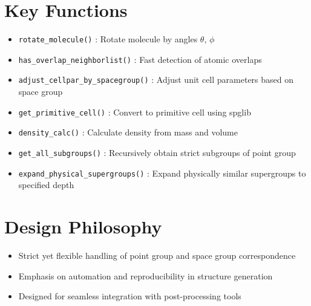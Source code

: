 \documentclass[12pt]{article}
\begin{document}
\section{Key Functions}
\begin{itemize}
    \item \texttt{rotate\_molecule()} : Rotate molecule by angles $\theta$, $\phi$
    \item \texttt{has\_overlap\_neighborlist()} : Fast detection of atomic overlaps
    \item \texttt{adjust\_cellpar\_by\_spacegroup()} : Adjust unit cell parameters based on space group
    \item \texttt{get\_primitive\_cell()} : Convert to primitive cell using spglib
    \item \texttt{density\_calc()} : Calculate density from mass and volume
    \item \texttt{get\_all\_subgroups()} : Recursively obtain strict subgroups of point group
    \item \texttt{expand\_physical\_supergroups()} : Expand physically similar supergroups to specified depth
\end{itemize}

\section{Design Philosophy}
\begin{itemize}
    \item Strict yet flexible handling of point group and space group correspondence
    \item Emphasis on automation and reproducibility in structure generation
    \item Designed for seamless integration with post-processing tools
\end{itemize}
\end{document}
